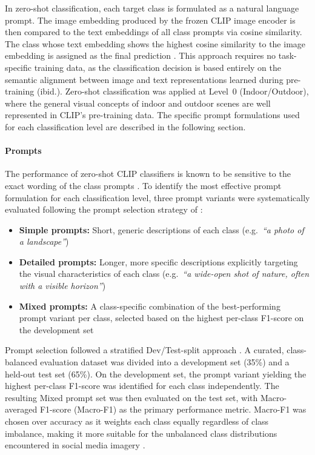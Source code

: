 \documentclass[hidelinks, 11pt]{article}
\begin{document}
In zero-shot classification, each target class is formulated as a natural language prompt. The image embedding produced by the frozen CLIP image encoder is then compared to the text embeddings of all class prompts via cosine similarity. The class whose text embedding shows the highest cosine similarity to the image embedding is assigned as the final prediction \citep{radford2021learning}. This approach requires no task-specific training data, as the classification decision is based entirely on the semantic alignment 
between image and text representations learned during pre-training (ibid.). Zero-shot classification was applied at Level~0 (Indoor/Outdoor), where the general visual concepts of indoor and outdoor scenes are well represented in CLIP's pre-training data. The specific prompt formulations used for each classification level are described in the following section.


\paragraph{Prompts}

The performance of zero-shot CLIP classifiers is known to be sensitive to the exact wording of the class prompts \citep{radford2021learning}. To identify the most effective prompt formulation for each classification level, three prompt variants were systematically evaluated following the prompt selection strategy of \citet{liao2025mapping}:

\begin{itemize}
    \item \textbf{Simple prompts:} Short, generic descriptions of each class
    (e.g.\ \textit{``a photo of a landscape''})
    \item \textbf{Detailed prompts:} Longer, more specific descriptions
    explicitly targeting the visual characteristics of each class
    (e.g.\ \textit{``a wide-open shot of nature, often with a visible horizon''})
    \item \textbf{Mixed prompts:} A class-specific combination of the
    best-performing prompt variant per class, selected based on the highest
    per-class F1-score on the development set
\end{itemize}

Prompt selection followed a stratified Dev/Test-split approach 
\citep{liao2025mapping}. A curated, class-balanced evaluation dataset was divided into a development set (35\%) and a held-out test set (65\%). On the development set, the prompt variant yielding the highest per-class F1-score was identified for each class independently. The resulting Mixed prompt set was then evaluated on the test set, with Macro-averaged F1-score (Macro-F1) 
as the primary performance metric. Macro-F1 was chosen over accuracy as it weights each class equally regardless of class imbalance, making it more suitable for the unbalanced class distributions encountered in social media imagery \citep{liao2025mapping}.
\end{document}
